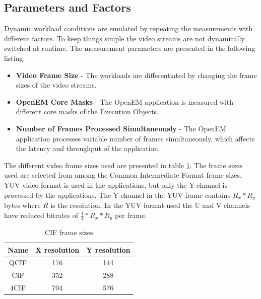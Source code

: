 \subsection{Parameters and Factors}
Dynamic workload conditions are emulated by repeating the measurements with
different factors. To keep things simple the video streams are not dynamically
switched at runtime. The measurement parameters are presented in the following
listing.

\begin{itemize}
    \item \textbf{Video Frame Size} - The workloads are differentiated by
        changing the frame sizes of the video streams.
    \item \textbf{OpenEM Core Masks} - The OpenEM application is measured
        with different core masks of the Execution Objects.
    \item \textbf{Number of Frames Processed Simultaneously} - The OpenEM
        application processes variable number of frames simultaneously, which
        affects the latency and throughput of the application.
\end{itemize}

The different video frame sizes used are presented in table
\ref{tab:cif_frames}. The frame sizes used are selected from among the Common
Intermediate Format frame sizes.  YUV video
format is used in the applications, but only the Y channel is processed by the
applications. The Y channel in the YUV frame contains $R_{x} * R_{y}$ bytes
where $R$ is the resolution. In the YUV format used the U and V channels have
reduced bitrates of $\frac{1}{4} * R_{x} * R_{y}$ per frame.

\begin{table}
    \begin{center}
        \begin{tabular}{ c c c }
            Name  & X resolution  & Y resolution \\ \hline
            QCIF  & 176           & 144          \\ \hline
            CIF   & 352           & 288          \\ \hline
            4CIF  & 704           & 576          \\ \hline
        \end{tabular}
        \caption{CIF frame sizes}
        \label{tab:cif_frames}
    \end{center}
\end{table}

